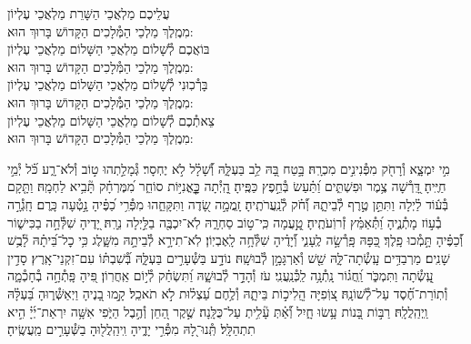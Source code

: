 \documentclass[twoside, openany, parskip=half, 11pt]{book}
\begin{document}
\birkashabonim

\medskip



עֲלֵיכֶם מַלְאֲכֵי הַשָּׁרֵת מַלְאֲכֵי עֶלְיוֹן\\ מִמֶֽלֶךְ מַלְכֵי הַמְּ֯לָכִים הַקָּדוֹשׁ בָּרוּךְ הוּא: \\
בּוֹאֲכֶם לְ֯שָׁלוֹם מַלְאֲכֵי הַשָּׁלוֹם מַלְאֲכֵי עֶלְיוֹן\\ מִמֶֽלֶךְ מַלְכֵי הַמְּ֯לָכִים הַקָּדוֹשׁ בָּרוּךְ הוּא:\\
בָּרְ֯כֽוּנִי לְ֯שָׁלוֹם מַלְאֲכֵי הַשָּׁלוֹם מַלְאֲכֵי עֶלְיוֹן \\ מִמֶֽלֶךְ מַלְכֵי הַמְּ֯לָכִים הַקָּדוֹשׁ בָּרוּךְ הוּא:\\
צֵאתְ֯כֶם לְ֯שָׁלוֹם מַלְאֲכֵי הַשָּׁלוֹם מַלְאֲכֵי עֶלְיוֹן\\ מִמֶֽלֶךְ מַלְכֵי הַמְּ֯לָכִים הַקָּדוֹשׁ בָּרוּךְ הוּא:

\vfill
\clearpage


מִ֣י יִמְצָ֑א וְ֯רָחֹ֖ק מִפְּ֯נִינִ֣ים מִכְרָֽהּ׃ \hfill \break
בָּ֣טַח בָּ֭הּ לֵ֥ב בַּעְלָּ֑הּ וְ֝֯שָׁלָ֗ל לֹ֣א יֶחְסָר׃ \hfill \break
גְּ֯מָלַ֣תְהוּ ט֣וֹב וְ֯לֹא־רָ֑ע כֹּ֝֗ל יְ֯מֵ֣י חַיֶּֽיהָ׃ \hfill \break
דָּֽ֭רְ֯שָׁה צֶ֥מֶר וּפִשְׁתִּ֑ים וַ֝תַּ֗עַשׂ בְּ֯חֵ֣פֶץ כַּפֶּֽיהָ׃ \hfill \break
הָֽ֭יְ֯תָה כׇׇׇׇׇׇׇׇׇׇׇׇׇׇׇׇּֽאֳנִיּ֣וֹת סוֹחֵ֑ר מִ֝מֶּרְחָ֗ק תָּ֘בִ֥יא לַחְמָֽהּ׃ \hfill \break
וַתָּ֤קָם בְּ֯ע֬וֹד לַ֗יְלָה וַתִּתֵּ֣ן טֶ֣רֶף לְ֯בֵיתָ֑הּ וְ֝֯חֹ֗ק לְ֯נַֽעֲרֹתֶֽיהָ׃ \hfill \break
זָֽמֲמָ֣ה שָׂ֭דֶה וַתִּקָּחֵ֑הוּ מִפְּ֯רִ֥י כַ֝פֶּ֗יהָ נָ֣טְ֯עָה כָּֽרֶם׃ \hfill \break
חָֽגְ֯רָ֣ה בְ֯ע֣וֹז מָתְ֯נֶ֑יהָ וַ֝תְּ֯אַמֵּ֗ץ זְ֯רוֹֽעֹתֶֽיהָ׃ \hfill \break
טָֽ֣֭עֲמָה כִּֽי־ט֣וֹב סַחְרָ֑הּ לֹֽא־יִכְבֶּ֖ה בַלַּ֣יְלָה נֵרָֽהּ׃ \hfill \break
יָ֭דֶיהָ שִׁלְּ֯חָ֣ה בַכִּישׁ֑וֹר וְ֝֯כַפֶּ֗יהָ תָּ֣מְ֯כוּ פָֽלֶךְ׃ \hfill \break
כַּ֭פָּהּ פָּֽרְ֯שָׂ֣ה לֶֽעָנִ֑י וְ֝֯יָדֶ֗יהָ שִׁלְּ֯חָ֥ה לָֽאֶבְיֽוֹן׃ \hfill \break
לֹֽא־תִירָ֣א לְ֯בֵיתָ֣הּ מִשָּׁ֑לֶג כִּ֥י כׇל־בֵּ֝יתָ֗הּ לָ֘בֻ֥שׁ שָׁנִֽים׃ \hfill \break
מַרְבַדִּ֥ים עָֽשְׂ֯תָה־לָּ֑הּ שֵׁ֖שׁ וְ֯אַרְגָּמָ֣ן לְ֯בוּשָֽׁהּ׃ \hfill \break
נוֹדָ֣ע בַּשְּׁ֯עָרִ֣ים בַּעְלָּ֑הּ בְּ֝֯שִׁבְתּ֗וֹ עִם־זִקְנֵי־אָֽרֶץ׃ \hfill \break
סָדִ֣ין עָֽ֭שְׂ֯תָה וַתִּמְכֹּ֑ר וַֽ֝חֲג֗וֹר נָֽתְ֯נָ֥ה לַֽכְּ֯נַֽעֲנִֽי׃ \hfill \break
עֹז וְ֯הָדָ֣ר לְ֯בוּשָׁ֑הּ וַ֝תִּשְׂחַ֗ק לְ֯י֣וֹם אַֽחֲרֽוֹן׃ \hfill \break
פִּ֭יהָ פָּֽתְ֯חָ֣ה בְ֯חָכְ֯מָ֑ה וְ֯תֽוֹרַת־חֶ֝֗סֶד עַל־לְ֯שׁוֹנָֽהּ׃ \hfill \break
צ֭וֹֽפִיָּה הֲֽלִיכ֣וֹת בֵּיתָ֑הּ וְ֯לֶ֥חֶם עַ֝צְל֗וּת לֹ֣א תֹאכֵֽל׃ \hfill \break
קָ֣מוּ בָ֭נֶיהָ וַיְאַשְּׁ֯ר֑וּהָ בַּ֝עְלָּ֗הּ וַֽיְהַֽלֲלָֽהּ׃ \hfill \break
רַבּ֣וֹת בָּ֭נוֹת עָ֥שׂוּ חָ֑יִל וְ֝֯אַ֗תְּ עָ֘לִ֥יתְ עַל־כֻּלָּֽנָה׃ \hfill \break
שֶׁ֣קֶר הַ֭חֵן וְ֯הֶ֣בֶל הַיֹּ֑פִי אִשָּׁ֥ה יִרְאַת־יְ֜יָ֗ הִ֣יא תִתְהַלָּֽל׃\hfill \break
תְּֽ֯נוּ־לָ֭הּ מִפְּ֯רִ֣י יָדֶ֑יהָ וִֽיהַֽלֲל֖וּהָ בַשְּׁ֯עָרִ֣ים מַֽעֲשֶֽׂיהָ׃\hfill \break
\end{document}
